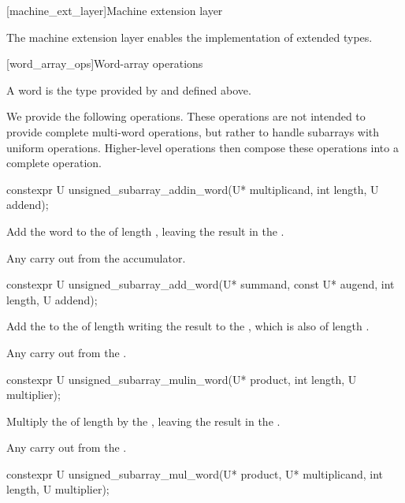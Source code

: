 \begin{addedblock}
[machine_ext_layer]{Machine extension layer}

The machine extension layer enables the implementation of extended types.

[word_array_ops]{Word-array operations}

A word is the type provided by  and defined above.

We provide the following operations. These operations are not intended to provide complete multi-word operations, but rather to handle subarrays with uniform operations. Higher-level operations then compose these operations into a complete operation.

\begin{itemdecl}
constexpr U unsigned_subarray_addin_word(U* multiplicand, int length, U addend);
\end{itemdecl}

\begin{itemdescr}
\effects Add the word  to the  of length , leaving the result in the .

\returns Any carry out from the accumulator.
\end{itemdescr}

\begin{itemdecl}
constexpr U unsigned_subarray_add_word(U* summand, const U* augend, int length, U addend);
\end{itemdecl}

\begin{itemdescr}
\effects Add the  to the  of length  writing the result to the , which is also of length .

\returns Any carry out from the .
\end{itemdescr}

\begin{itemdecl}
constexpr U unsigned_subarray_mulin_word(U* product, int length, U multiplier);
\end{itemdecl}

\begin{itemdescr}
\effects Multiply the  of length  by the , leaving the result in the .

\returns Any carry out from the .
\end{itemdescr}

\begin{itemdecl}
constexpr U unsigned_subarray_mul_word(U* product, U* multiplicand, int length, U multiplier);
\end{itemdecl}


\end{addedblock}
